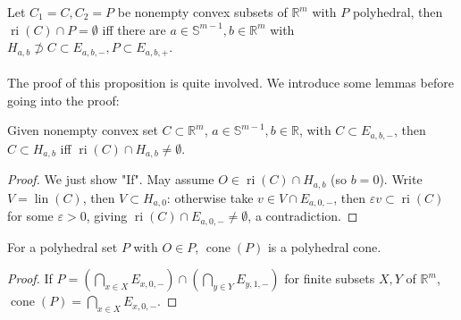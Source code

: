 \begin{prop}\label{prop:017-polyhedral-proper-sep}
	Let $C_1=C,C_2=P$ be nonempty convex subsets of $\mathbb{R}^m$ with $P$ polyhedral, then $\operatorname{ri}(C)\cap P=\emptyset$ iff there are $a\in \mathbb{S}^{m-1},b\in \mathbb{R}^m$ with $H_{a,b}\nsupset C\subset E_{a,b,-},P\subset E_{a,b,+}$.
\end{prop}

\paragraph{}The proof of this proposition is quite involved. We introduce some lemmas before going into the proof:

\begin{lemm}\label{lemm:017-criterion-hyperplane-containment}
	Given nonempty convex set $C\subset \mathbb{R}^m$, $a\in \mathbb{S}^{m-1},b\in \mathbb{R}$, with $C\subset E_{a,b,-}$, then $C\subset H_{a,b}$ iff $\operatorname{ri}(C)\cap H_{a,b}\neq\emptyset$.
\end{lemm}

\begin{proof}
	We just show "If". May assume $O\in \operatorname{ri}(C)\cap H_{a,b}$ (so $b=0$). Write $V=\operatorname{lin}(C)$, then $V\subset H_{a,0}$: otherwise take $v\in V\cap E_{a,0,-}$, then $\varepsilon v\subset \operatorname{ri}(C)$ for some $\varepsilon >0$, giving $\operatorname{ri}(C)\cap E_{a,0,-}\neq\emptyset$, a contradiction.
\end{proof}

\begin{lemm}\label{lemm:017-polyhedral-cone-cone-lemma}
	For a polyhedral set $P$ with $O\in P$, $\operatorname{cone}(P)$ is a polyhedral cone.
\end{lemm}
\begin{proof}
	If $P=\left(\bigcap_{x\in X}E_{x,0,-}\right)\cap \left(\bigcap_{y\in Y}E_{y,1,-}\right)$ for finite subsets $X,Y$ of $\mathbb{R}^m$, $\operatorname{cone}(P)=\bigcap_{x\in X}E_{x,0,-}$.
\end{proof}

